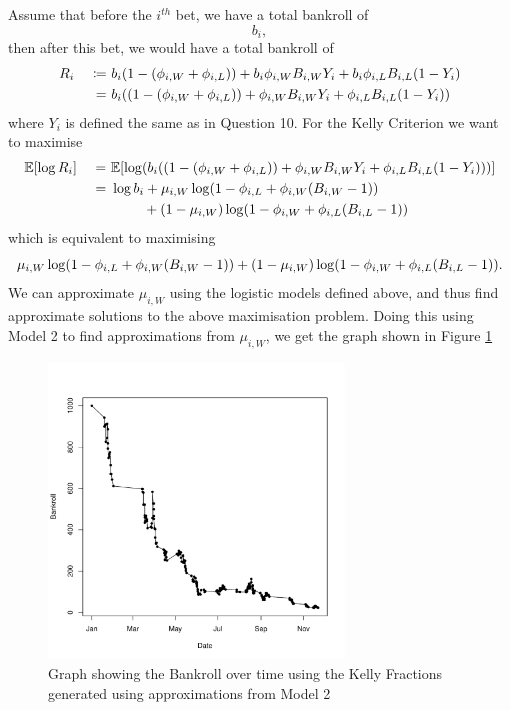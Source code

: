 \documentclass[11pt]{article} %
\let\originalleft\left
\let\originalright\right
\renewcommand{\left}{\mathopen{}\mathclose\bgroup\originalleft}
\renewcommand{\right}{\aftergroup\egroup\originalright}
\begin{document}
Assume that before the $i^{th}$ bet, we have a total bankroll of 
$$b_i,$$ 
then after this bet, we would have a total bankroll of 
\begin{alignat*}{2}
	& R_i &\ \coloneqq\ & b_i\left(1-\left(\phi_{i, W} + \phi_{i, L}\right)\right) + b_i\phi_{i, W}B_{i, W}Y_i + b_i\phi_{i, L}B_{i, L}\left(1-Y_i\right) \\
	& &\ =\ & b_i\left(\left(1-\left(\phi_{i, W} + \phi_{i, L}\right)\right) + \phi_{i, W}B_{i, W}Y_i + \phi_{i, L}B_{i, L}\left(1-Y_i\right)\right)
\end{alignat*}
where $Y_i$ is defined the same as in Question 10. For the Kelly Criterion we want to maximise
\begin{alignat*}{2}
	&\mathbb{E}\left[\log{R_i}\right] &\ =\ & \mathbb{E}\left[\log\left(b_i\left(\left(1-\left(\phi_{i, W} + \phi_{i, L}\right)\right) + \phi_{i, W}B_{i, W}Y_i + \phi_{i, L}B_{i, L}\left(1-Y_i\right)\right)\right)\right] \\
	& &\ =\ & \log{b_i} + \mu_{i, W}\log\left(1-\phi_{i, L} + \phi_{i, W}\left(B_{i, W}-1\right)\right)\\
	&&& \qquad \ + \left(1-\mu_{i, W}\right)\log\left(1-\phi_{i, W} + \phi_{i, L}\left(B_{i, L}-1\right)\right)
\end{alignat*}
which is equivalent to maximising
\begin{equation*}
	\mu_{i, W}\log\left(1-\phi_{i, L} + \phi_{i, W}\left(B_{i, W}-1\right)\right) + \left(1-\mu_{i, W}\right)\log\left(1-\phi_{i, W} + \phi_{i, L}\left(B_{i, L}-1\right)\right).
\end{equation*}
We can approximate $\mu_{i, W}$ using the logistic models defined above, and thus find approximate solutions to the above maximisation problem. Doing this using Model 2 to find approximations from $\mu_{i,W}$, we get the graph shown in Figure \ref{fig:kelly_criterion}
\begin{figure}[ht]
	\centering
	\includegraphics[width=0.7\textwidth]{"../R File/question 13 bankroll"}
	\caption{Graph showing the Bankroll over time using the Kelly Fractions generated using approximations from Model 2}
	\label{fig:kelly_criterion}
\end{figure}
\end{document}
